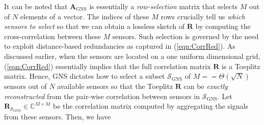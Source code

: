 It can be noted that $\mathbf{A}_{\text{GNS}}$ is essentially a {\em row-selection} matrix that selects $M$ out of $N$ elements of a vector. The indices of these $M$ rows crucially tell us {\em which sensors to select} so that we can obtain a lossless sketch of $\mathbf{R}$ by computing the cross-correlation between these $M$ sensors. Such selection is governed by the need to exploit distance-based redundancies as captured in (\ref{eqn:CorrRed}). As discussed earlier, when the sensors are located on a one uniform dimensional grid, (\ref{eqn:CorrRed}) essentially implies that the full correlation matrix $\mathbf{R}$ is a Toeplitz matrix. %
Hence, GNS dictates how to select a subset $\mathcal{S}_{\text{GNS}}$ of $M =  = \Theta(\sqrt{N})$ sensors out of $N$ available sensors so that the Toeplitz $\mathbf{R}$ can be {\em exactly reconstructed} from the pair-wise correlation between sensors in $\mathcal{S}_{\text{GNS}}$. Let $\mathbf{R}_{\mathcal{S}_{\text{GNS}}} \in \mathbb{C}^{M\times M}$ be the correlation matrix computed by aggregating the signals from these sensors. Then, we have 
